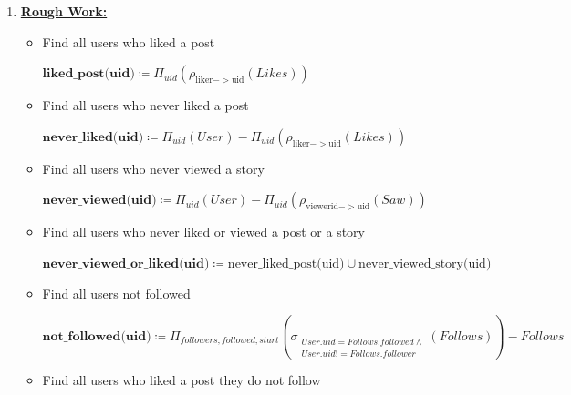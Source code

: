 \documentclass[12pt]{article}
\begin{document}
\begin{enumerate}[1.]
    \item

    \bigskip

    \underline{\textbf{Rough Work:}}

    \bigskip

    \begin{itemize}
        \item Find all users who liked a post

        \begin{mdframed}
        $\textbf{liked\_post(uid)} \coloneqq \Pi_{uid}(\rho_{\text{liker}->\text{uid}}(Likes))$
        \end{mdframed}

        \item Find all users who never liked a post

        \begin{mdframed}
        $\textbf{never\_liked(uid)} \coloneqq \Pi_{uid}(User) - \Pi_{uid}(\rho_{\text{liker}->\text{uid}}(Likes))$
        \end{mdframed}

        \item Find all users who never viewed a story

        \begin{mdframed}
        $\textbf{never\_viewed(uid)} \coloneqq \Pi_{uid}(User) - \Pi_{uid}(\rho_{\text{viewerid}->\text{uid}}(Saw))$
        \end{mdframed}

        \item Find all users who never liked or viewed a post or a story

        \begin{mdframed}
        $\textbf{never\_viewed\_or\_liked(uid)} \coloneqq \text{never\_liked\_post(uid)} \cup \text{never\_viewed\_story(uid)}$
        \end{mdframed}


        \item Find all users not followed

        \begin{mdframed}
        $\textbf{not\_followed(uid)} \coloneqq \Pi_{followers, followed, start}(\sigma_{\substack{User.uid = Follows.followed \land\\ User.uid != Follows.follower}}(Follows)) - Follows$
        \end{mdframed}

        \item Find all users who liked a post they do not follow


\end{itemize}
\end{enumerate}
\end{document}
